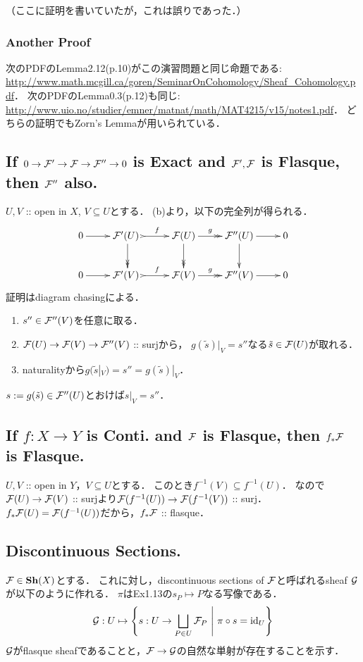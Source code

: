 \documentclass[a4paper]{jsarticle}
\newcommand{\Sh}{\mathbf{Sh}}
\begin{document}
    （ここに証明を書いていたが，これは誤りであった．）

    \subsubsection{Another Proof}
    次のPDFのLemma2.12(p.10)がこの演習問題と同じ命題である: 
    \url{http://www.math.mcgill.ca/goren/SeminarOnCohomology/Sheaf_Cohomology.pdf}．
    次のPDFのLemma0.3(p.12)も同じ:
    \url{http://www.uio.no/studier/emner/matnat/math/MAT4215/v15/notes1.pdf}．
    どちらの証明でもZorn's Lemmaが用いられている．

    \subsection{If $0 \to \mathcal{F}' \to \mathcal{F} \to \mathcal{F}'' \to 0$ is Exact and $\mathcal{F}', \mathcal{F}$ is Flasque, then $\mathcal{F}''$ also.}
    $U,V$ :: open in $X$, $V \subseteq U$とする．
    (b)より，以下の完全列が得られる．
    \[
    \xymatrix
    {
    0 \ar[r]& \shF'(U)~ \ar@{>->}[r]^-{f} \ar@{->>}[d]& \shF(U) \ar@{->>}[r]^-{g} \ar@{->>}[d]& \shF''(U) \ar[r] \ar[d]& 0 \\
    0 \ar[r]& \shF'(V)~ \ar@{>->}[r]^-{f}& \shF(V) \ar@{->>}[r]^-{g}& \shF''(V) \ar[r]& 0
    }
    \]
    証明はdiagram chasingによる．
    \begin{enumerate}[(1)]
    \setlength{\itemindent}{2em}
        \item   $s'' \in \mathcal{F}''(V)$を任意に取る．
        \item   $\mathcal{F}(U) \to \mathcal{F}(V) \to \mathcal{F}''(V)$ :: surjから，
                $g(\tilde{s})|_V=s''$なる$\tilde{s} \in \mathcal{F}(U)$が取れる．
        \item   naturalityから$g(\tilde{s}|_V)=s''=g(\tilde{s})|_V$．
    \end{enumerate}
    $s:=g(\tilde{s}) \in \mathcal{F}''(U)$とおけば$s|_V=s''$．

    \subsection{If $f: X \to Y$ is Conti. and $\mathcal{F}$ is Flasque, then $f_* \mathcal{F}$ is Flasque.}
    $U,V$ :: open in $Y$，$V \subseteq U$とする．
    このとき$f^{-1}(V) \subseteq f^{-1}(U)$．
    なので$\mathcal{F}(U) \to \mathcal{F}(V)$ :: surjより$\mathcal{F}(f^{-1}(U)) \to \mathcal{F}(f^{-1}(V))$ :: surj．
    $f_* \mathcal{F}(U)=\mathcal{F}(f^{-1}(U))$だから，$f_* \mathcal{F}$ :: flasque．

    \subsection{Discontinuous Sections.}
    $\shF \in \Sh(X)$とする．
    これに対し，discontinuous sections of $\mathcal{F}$と呼ばれるsheaf $\mathcal{G}$が以下のように作れる．
    $\pi$はEx1.13の$s_P \mapsto P$なる写像である．
    \[ \mathcal{G}: U \mapsto \left\{ s:U \to \bigsqcup_{P \in U} \mathcal{F}_P ~\middle|~ \pi \circ s=\mathrm{id}_{U} \right\} \]
    $\mathcal{G}$がflasque sheafであることと，$\mathcal{F} \to \mathcal{G}$の自然な単射が存在することを示す．
    
\end{document}
